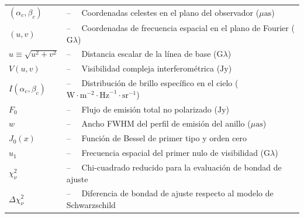 \begin{tabular}{ll}
$(\alpha_c, \beta_c)$ & --$\quad$ Coordenadas celestes en el plano del observador ($\mu\text{as}$)\\
$(u, v)$ & --$\quad$ Coordenadas de frecuencia espacial en el plano de Fourier ($\text{G}\lambda$)\\
$u \equiv \sqrt{u^2 + v^2}$ & --$\quad$ Distancia escalar de la línea de base ($\text{G}\lambda$)\\
$V(u, v)$ & --$\quad$ Visibilidad compleja interferométrica ($\text{Jy}$)\\
$I(\alpha_c, \beta_c)$ & --$\quad$ Distribución de brillo específico en el cielo ($\text{W}\cdot\text{m}^{-2}\cdot\text{Hz}^{-1}\cdot\text{sr}^{-1}$)\\
$F_0$ & --$\quad$ Flujo de emisión total no polarizado ($\text{Jy}$)\\
$w$ & --$\quad$ Ancho FWHM del perfil de emisión del anillo ($\mu\text{as}$)\\
$J_0(x)$ & --$\quad$ Función de Bessel de primer tipo y orden cero\\
$u_1$ & --$\quad$ Frecuencia espacial del primer nulo de visibilidad ($\text{G}\lambda$)\\
$\chi^2_\nu$ & --$\quad$ Chi-cuadrado reducido para la evaluación de bondad de ajuste\\
$\Delta\chi^2_\nu$ & --$\quad$ Diferencia de bondad de ajuste respecto al modelo de Schwarzschild\\
\end{tabular}